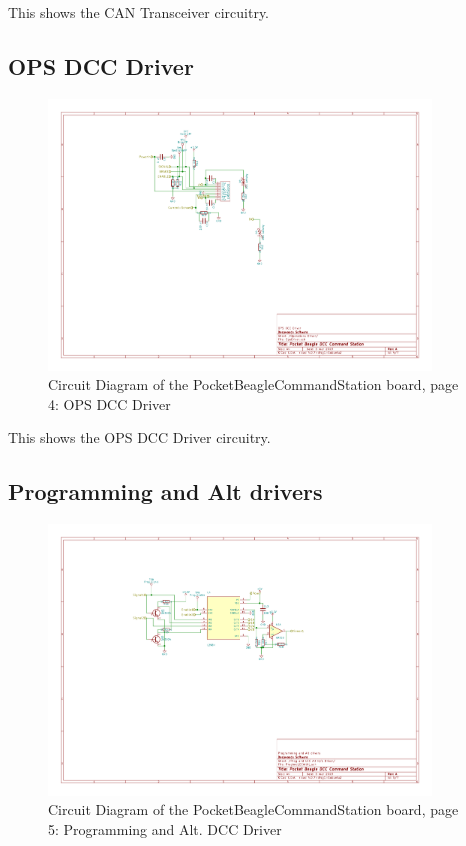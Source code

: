 This shows the CAN Transceiver circuitry.
\clearpage
\subsection{OPS DCC Driver}
\begin{figure}[hbpt]\begin{centering}%
\includegraphics[width=4in]{PocketBeagleCommandStation-4.pdf}
\caption{Circuit Diagram of the PocketBeagleCommandStation board, page 4: OPS 
DCC Driver}
\end{centering}\end{figure}

This shows the OPS DCC Driver circuitry.
\clearpage
\subsection{Programming and Alt drivers}
\begin{figure}[hbpt]\begin{centering}%
\includegraphics[width=4in]{PocketBeagleCommandStation-5.pdf}
\caption{Circuit Diagram of the PocketBeagleCommandStation board, page 5: 
Programming and Alt. DCC Driver}
\end{centering}\end{figure}

